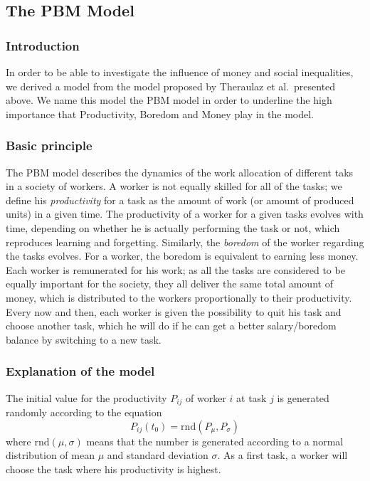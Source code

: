 \newcommand{\rnd}[2]{\mathrm{rnd}(#1,#2)}


\subsection{The PBM Model}

\subsubsection{Introduction}
In order to be able to investigate the influence of money and social inequalities, we derived a model from the model proposed by Theraulaz et al.\ presented above. We name this model the PBM model in order to underline the high importance that Productivity, Boredom and Money play in the model.

\subsubsection{Basic principle}
The PBM model describes the dynamics of the work allocation of different taks in a society of workers. 
A worker is not equally skilled for all of the tasks; we define his \emph{productivity} for a task as the amount of work (or amount of produced units) in a given time. 
The productivity of a worker for a given tasks evolves with time, depending on whether he is actually performing the task or not, which reproduces learning and forgetting. Similarly, the \emph{boredom} of the worker regarding the tasks evolves. For a worker, the boredom is equivalent to earning less money.
Each worker is remunerated for his work; as all the tasks are considered to be equally important for the society, they all deliver the same total amount of money, which is distributed to the workers proportionally to their productivity.
Every now and then, each worker is given the possibility to quit his task and choose another task, which he will do if he can get a better salary/boredom balance by switching to a new task. 


\subsubsection{Explanation of the model}
The initial value for the productivity $P_{ij}$ of worker $i$ at task $j$ is generated randomly according to the equation
\begin{equation}
	P_{ij}(t_0) = \rnd{P_\mu}{P_\sigma}
\end{equation}
where $\rnd{\mu}{\sigma}$ means that the number is generated according to a normal distribution of mean $\mu$ and standard deviation $\sigma$.
As a first task, a worker will choose the task where his productivity is highest.


